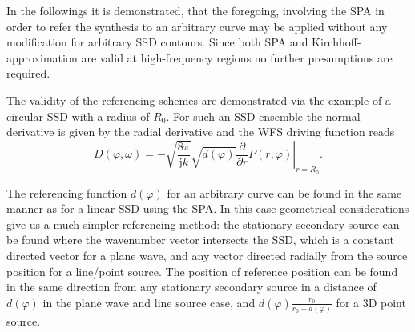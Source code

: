 \documentclass[12pt,a4paper]{article}
\newcommand{\te}{\mathrm{e}}
\newcommand{\ti}{\mathrm{j}}
\newcommand{\sinfi}{\sin\varphi}
\newcommand{\cosfi}{\cos\varphi}
\newcommand{\vxo}{\mathbf{x}_0}
\begin{document}
\vspace{3mm}
In the followings it is demonstrated, that the foregoing, involving the SPA in order to refer the synthesis to an arbitrary curve may be applied without any modification for arbitrary SSD contours. Since both SPA and Kirchhoff-approximation are valid at high-frequency regions no further presumptions are required.

The validity of the referencing schemes are demonstrated via the example of a circular SSD with a radius of $R_0$. For such an SSD ensemble the normal derivative is given by the radial derivative
and the WFS driving function reads
\begin{equation}
D(\varphi,\omega) = - \sqrt{\frac{8\pi}{\ti k}}\sqrt{d(\varphi)} \left. \frac{\partial}{\partial r} P(r,\varphi) \right|_{r = R_0}.
\end{equation}

\vspace{3mm}
The referencing function $d(\varphi)$ for an arbitrary curve can be found in the same manner as for a linear SSD using the SPA. In this case geometrical considerations give us a much simpler referencing method: the stationary secondary source can be found where the wavenumber vector intersects the SSD, which is a constant directed vector for a plane wave, and any vector directed radially from the source position for a line/point source. The position of reference position can be found in the same direction from any stationary secondary source in a distance of $d(\varphi)$ in the plane wave and line source case, and $d(\varphi)\frac{r_0}{r_0-d(\varphi)}$ for a 3D point source.
\end{document}
